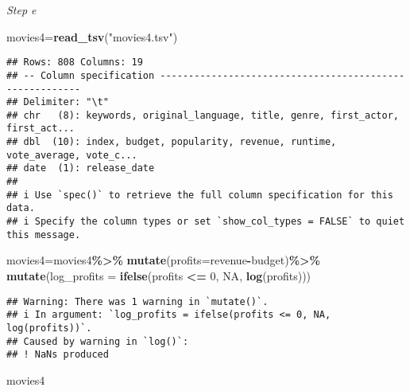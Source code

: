 \documentclass[
]{article}
\newenvironment{Shaded}{\begin{snugshade}}{\end{snugshade}}
\newcommand{\AttributeTok}[1]{\textcolor[rgb]{0.13,0.29,0.53}{#1}}
\newcommand{\ConstantTok}[1]{\textcolor[rgb]{0.56,0.35,0.01}{#1}}
\newcommand{\DecValTok}[1]{\textcolor[rgb]{0.00,0.00,0.81}{#1}}
\newcommand{\FunctionTok}[1]{\textcolor[rgb]{0.13,0.29,0.53}{\textbf{#1}}}
\newcommand{\NormalTok}[1]{#1}
\newcommand{\OtherTok}[1]{\textcolor[rgb]{0.56,0.35,0.01}{#1}}
\newcommand{\SpecialCharTok}[1]{\textcolor[rgb]{0.81,0.36,0.00}{\textbf{#1}}}
\newcommand{\StringTok}[1]{\textcolor[rgb]{0.31,0.60,0.02}{#1}}
\begin{document}
\emph{Step e}

\begin{Shaded}
\begin{Highlighting}[]
\NormalTok{movies4}\OtherTok{=}\FunctionTok{read\_tsv}\NormalTok{(}\StringTok{"movies4.tsv"}\NormalTok{)}
\end{Highlighting}
\end{Shaded}

\begin{verbatim}
## Rows: 808 Columns: 19
## -- Column specification --------------------------------------------------------
## Delimiter: "\t"
## chr   (8): keywords, original_language, title, genre, first_actor, first_act...
## dbl  (10): index, budget, popularity, revenue, runtime, vote_average, vote_c...
## date  (1): release_date
## 
## i Use `spec()` to retrieve the full column specification for this data.
## i Specify the column types or set `show_col_types = FALSE` to quiet this message.
\end{verbatim}

\begin{Shaded}
\begin{Highlighting}[]
\NormalTok{movies4}\OtherTok{=}\NormalTok{movies4}\SpecialCharTok{\%\textgreater{}\%}
  \FunctionTok{mutate}\NormalTok{(}\AttributeTok{profits=}\NormalTok{revenue}\SpecialCharTok{{-}}\NormalTok{budget)}\SpecialCharTok{\%\textgreater{}\%}
  \FunctionTok{mutate}\NormalTok{(}\AttributeTok{log\_profits =} \FunctionTok{ifelse}\NormalTok{(profits }\SpecialCharTok{\textless{}=} \DecValTok{0}\NormalTok{, }\ConstantTok{NA}\NormalTok{, }\FunctionTok{log}\NormalTok{(profits)))}
\end{Highlighting}
\end{Shaded}

\begin{verbatim}
## Warning: There was 1 warning in `mutate()`.
## i In argument: `log_profits = ifelse(profits <= 0, NA, log(profits))`.
## Caused by warning in `log()`:
## ! NaNs produced
\end{verbatim}

\begin{Shaded}
\begin{Highlighting}[]
\NormalTok{movies4}
\end{Highlighting}
\end{Shaded}
\end{document}
